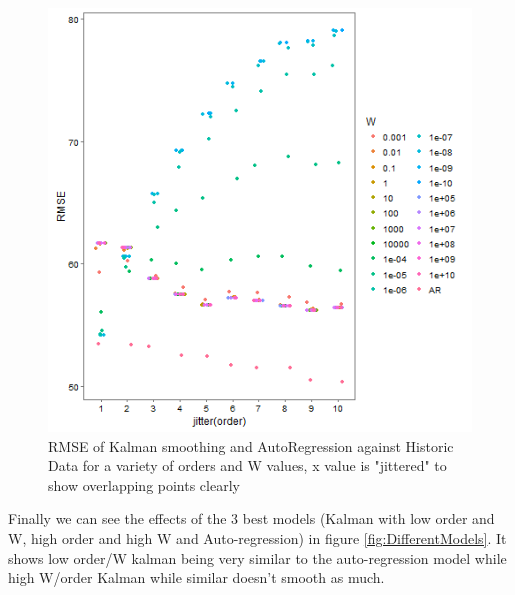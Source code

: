 \documentclass{sig-alternate-05-2015}
\begin{document}
\begin{figure}[ht]
	\includegraphics[width=\linewidth]{RMSE_order_real.png}
	\centering
	\caption{RMSE of Kalman smoothing and AutoRegression against Historic Data for a variety of orders and W values, x value is "jittered" to show overlapping points clearly}
			\label{fig:RMSE_real}
\end{figure}

Finally we can see the effects of the 3 best models (Kalman with low order and W, high order and high W and Auto-regression) in figure \ref{fig:DifferentModels}. It shows low order/W kalman being very similar to the auto-regression model while high W/order Kalman while similar doesn't smooth as much.  
\end{document}
